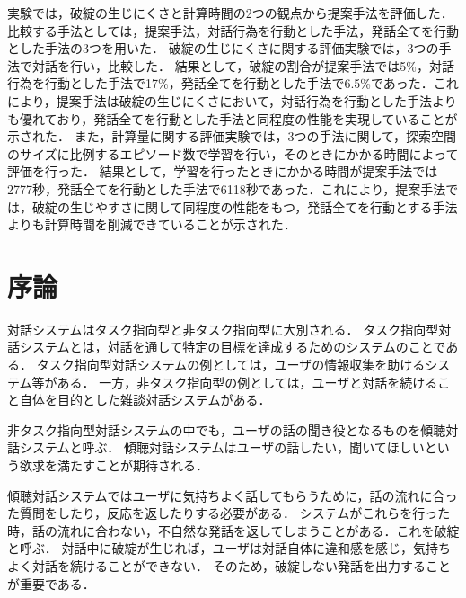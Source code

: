 \documentclass[12pt,a4paper,twoside,openany]{jbook}
\begin{document}
{%
実験では，破綻の生じにくさと計算時間の2つの観点から提案手法を評価した．
比較する手法としては，提案手法，対話行為を行動とした手法，発話全てを行動とした手法の3つを用いた．
破綻の生じにくさに関する評価実験では，3つの手法で対話を行い，比較した．
結果として，破綻の割合が提案手法では5\%，対話行為を行動とした手法で17\%，発話全てを行動とした手法で6.5\%であった．これにより，提案手法は破綻の生じにくさにおいて，対話行為を行動とした手法よりも優れており，発話全てを行動とした手法と同程度の性能を実現していることが示された．
また，計算量に関する評価実験では，3つの手法に関して，探索空間のサイズに比例するエピソード数で学習を行い，そのときにかかる時間によって評価を行った．
結果として，学習を行ったときにかかる時間が提案手法では2777秒，発話全てを行動とした手法で6118秒であった．これにより，提案手法では，破綻の生じやすさに関して同程度の性能をもつ，発話全てを行動とする手法よりも計算時間を削減できていることが示された．

}

\abstractpage
\tableofcontents
\cleardoublepage

\setcounter{page}{1}

%
\newcommand{\argmin}{\mathop{\rm arg~min}\limits}


\chapter{序論}
対話システムはタスク指向型と非タスク指向型に大別される．
タスク指向型対話システムとは，対話を通して特定の目標を達成するためのシステムのことである．
タスク指向型対話システムの例としては，ユーザの情報収集を助けるシステム等\cite{saruwatari}がある．
一方，非タスク指向型の例としては，ユーザと対話を続けること自体を目的とした雑談対話システムがある．

非タスク指向型対話システムの中でも，ユーザの話の聞き役となるものを傾聴対話システム\cite{meguro}\cite{ishida}と呼ぶ．
傾聴対話システムはユーザの話したい，聞いてほしいという欲求を満たすことが期待される．



傾聴対話システムではユーザに気持ちよく話してもらうために，話の流れに合った質問をしたり，反応を返したりする必要がある．
システムがこれらを行った時，話の流れに合わない，不自然な発話を返してしまうことがある．これを破綻と呼ぶ．
対話中に破綻が生じれば，ユーザは対話自体に違和感を感じ，気持ちよく対話を続けることができない．
そのため，破綻しない発話を出力することが重要である．
\end{document}
